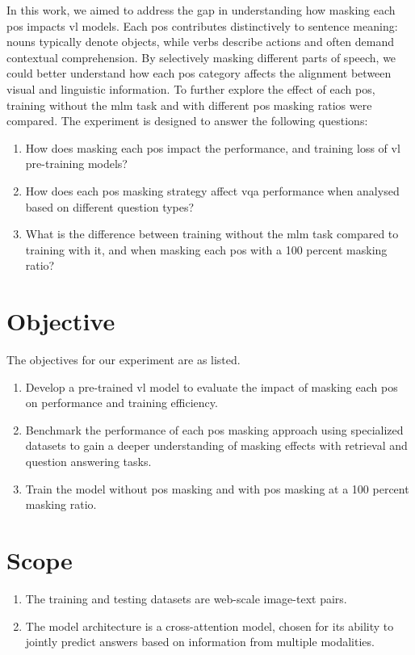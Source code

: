 In this work, we aimed to address the gap in understanding how masking each \acrfull{pos} impacts \acrshort{vl} models.  
Each \acrshort{pos} contributes distinctively to sentence meaning: nouns typically denote objects, while verbs describe actions and often demand contextual comprehension.  
By selectively masking different parts of speech, we could better understand how each \acrshort{pos} category affects the alignment between visual and linguistic information.  
To further explore the effect of each \acrshort{pos}, training without the \acrshort{mlm} task and with different \acrshort{pos} masking ratios were compared.
The experiment is designed to answer the following questions:  
\begin{enumerate}  
    \item How does masking each \acrshort{pos} impact the performance, and training loss of \acrshort{vl} pre-training models?  
    \item How does each \acrshort{pos} masking strategy affect \acrfull{vqa} performance when analysed based on different question types?  
    \item What is the difference between training without the \acrshort{mlm} task compared to training with it, and when masking each \acrshort{pos} with a 100 percent masking ratio?  
\end{enumerate}


\section{Objective}  
The objectives for our experiment are as listed.  
\begin{enumerate}  
    \item Develop a pre-trained \acrshort{vl} model to evaluate the impact of masking each \acrshort{pos} on performance and training efficiency.  
    \item Benchmark the performance of each \acrshort{pos} masking approach using specialized datasets to gain a deeper understanding of masking effects with retrieval and question answering tasks.  
    \item Train the model without \acrshort{pos} masking and with \acrshort{pos} masking at a 100 percent masking ratio.  
\end{enumerate}  

\section{Scope}
\begin{enumerate}  
    \item The training and testing datasets are web-scale image-text pairs.  
    \item The model architecture is a cross-attention model, chosen for its ability to jointly predict answers based on information from multiple modalities.  
\end{enumerate}  
